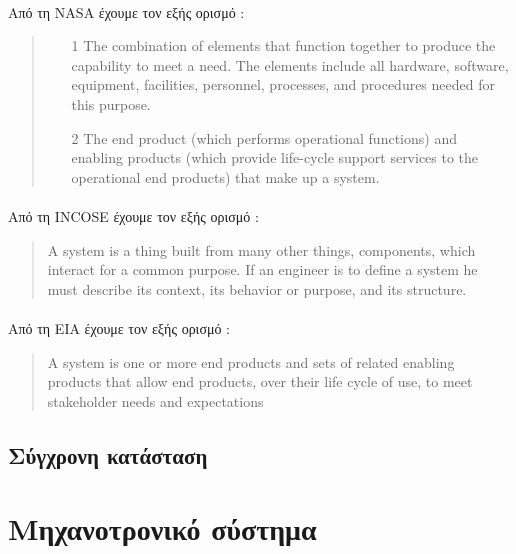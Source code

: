 \documentclass[a4paper,12pt,twoside]{report}
\begin{document}
{			\paragraph{}{Από τη \acrshort{NASA} έχουμε τον εξής ορισμό \cite{NASASystemsEngineeringHandbook} :
				\begin{quote}
					\begin{itemize}
						\item[1] The combination of elements that function together to produce the capability to meet a need. The elements include all hardware, software, equipment, facilities, personnel, processes, and procedures needed for this purpose.
						\item[2] The end product (which performs operational functions) and enabling products (which provide life-cycle support services to the operational end products) that make up a system.
					\end{itemize}
				\end{quote}
			}
			
			\paragraph{}{Από τη \acrshort{INCOSE} έχουμε τον εξής ορισμό \cite{EngineeringComplexSystemsWithModelsAndObjects} :
				\begin{quote}
					A system is a thing built from many other things, components, which interact for a common purpose. If an engineer is to define a system he must describe its context, its behavior or purpose, and its structure. 
				\end{quote}
			}
			
			\paragraph{}{Από τη \acrshort{EIA} έχουμε τον εξής ορισμό \cite{EIA632}:
				\begin{quote}
					A system is one or more end products and sets of related enabling products that allow end products, over their life cycle of use, to meet stakeholder needs and expectations
				\end{quote}
			}
			
		\subsection{Σύγχρονη κατάσταση}
		
		\section{Μηχανοτρονικό σύστημα}
		
}
\end{document}
